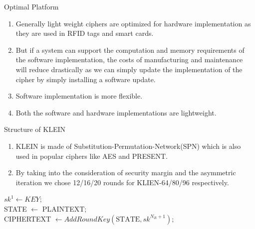 \begin{frame}{Optimal Platform}
\begin{enumerate}
    \item Generally light weight ciphers are optimized for hardware implementation as they are used in RFID tags and smart cards.
    \item But if a system can support the computation and memory requirements of the software implementation, the costs of manufacturing and maintenance will reduce drastically as we can simply update the implementation of the cipher by simply installing a software update.
    \item Software implementation is more flexible.
    \item Both the software and hardware implementations are lightweight.
\end{enumerate}
\end{frame}
\begin{frame}{Structure of KLEIN}
\begin{enumerate}
    \item KLEIN is made of Substitution-Permutation-Network(SPN) which is also used in popular ciphers like AES and PRESENT.
    \item By taking into the consideration of security margin and the asymmetric iteration we chose 12/16/20 rounds for KLIEN-64/80/96 respectively.
\end{enumerate}
\begin{algorithm}[H]
\SetAlgoLined
$sk^{1}\gets KEY$; \\
STATE $\gets$ PLAINTEXT;\\
 CIPHERTEXT $\gets AddRoundKey(\text{STATE}, sk^{N_{R}+1} )$;
 \caption{KLEIN CIPHER}
\end{algorithm}
\end{frame}

